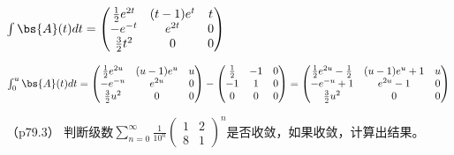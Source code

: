 \documentclass[12pt, a4paper, oneside, UTF8]{ctexbook}
\begin{document}
\begin{solution}
    $\int \bs{A}(t) dt=\begin{pmatrix}
        \frac{1}{2} e^{2t}& (t-1)e^t & t\\
        -e^{-t} & e^{2t} & 0\\
        \frac{3}{2}t^2 & 0 & 0
    \end{pmatrix}$
    
    $\int_{0}^u \bs{A}(t) dt=\begin{pmatrix}
        \frac{1}{2} e^{2u}& (u-1)e^u & u\\
        -e^{-u} & e^{2u} & 0\\
        \frac{3}{2}u^2 & 0 & 0
    \end{pmatrix}-\begin{pmatrix}
        \frac{1}{2} & -1 & 0\\
        -1 & 1 & 0\\
        0 &0& 0
    \end{pmatrix}=\begin{pmatrix}
        \frac{1}{2} e^{2u} -\frac{1}{2}& (u-1)e^u+1 & u\\
        -e^{-u}+1 & e^{2u}-1 & 0\\
        \frac{3}{2}u^2 & 0 & 0
    \end{pmatrix}$
\end{solution}

\begin{question}（p79.3）
    判断级数$\sum\limits_{n=0}^\infty \frac{1}{10^n}\begin{pmatrix}
        1 & 2 \\
        8& 1
    \end{pmatrix}^n$是否收敛，如果收敛，计算出结果。
\end{question}
\end{document}
